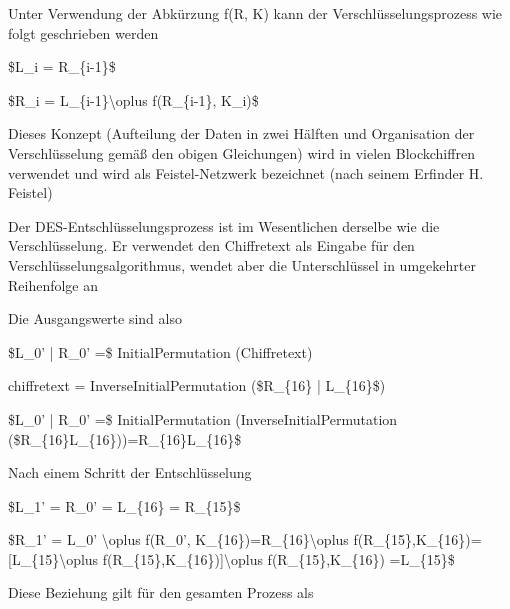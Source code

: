 \documentclass[a4paper]{article}
\begin{document}
\begin{multicols}{3}
      \begin{itemize*}
            \item Unter Verwendung der Abkürzung f(R, K) kann der
            Verschlüsselungsprozess wie folgt geschrieben werden
            \begin{itemize*}
                  \item \$L\_i = R\_\{i-1\}\$
                  \item \$R\_i = L\_\{i-1\}\textbackslash oplus f(R\_\{i-1\}, K\_i)\$
                  \item Dieses Konzept (Aufteilung der Daten in zwei Hälften und Organisation der Verschlüsselung gemäß den obigen Gleichungen) wird in vielen Blockchiffren verwendet und wird als Feistel-Netzwerk bezeichnet (nach seinem Erfinder H. Feistel)
            \end{itemize*}
            \item Der DES-Entschlüsselungsprozess ist im Wesentlichen derselbe wie die
            Verschlüsselung. Er verwendet den Chiffretext als Eingabe für den
            Verschlüsselungsalgorithmus, wendet aber die Unterschlüssel in
            umgekehrter Reihenfolge an
            \item Die Ausgangswerte sind also
            \begin{itemize*}
                  \item \$L\_0' \textbar| R\_0' =\$ InitialPermutation (Chiffretext)
                  \item chiffretext = InverseInitialPermutation (\$R\_\{16\} \textbar| L\_\{16\}\$)
                  \item \$L\_0' \textbar| R\_0' =\$ InitialPermutation (InverseInitialPermutation (\$R\_\{16\}\textbar\textbar L\_\{16\}))=R\_\{16\}\textbar\textbar L\_\{16\}\$
            \end{itemize*}
            \item Nach einem Schritt der Entschlüsselung
            \begin{itemize*}
                  \item \$L\_1' = R\_0' = L\_\{16\} = R\_\{15\}\$
                  \item \$R\_1' = L\_0' \textbackslash oplus f(R\_0', K\_\{16\})=R\_\{16\}\textbackslash oplus f(R\_\{15\},K\_\{16\})={[}L\_\{15\}\textbackslash oplus f(R\_\{15\},K\_\{16\}){]}\textbackslash oplus f(R\_\{15\},K\_\{16\}) =L\_\{15\}\$
            \end{itemize*}
            \item Diese Beziehung gilt für den gesamten Prozess als

\end{itemize*}
\end{multicols}
\end{document}
